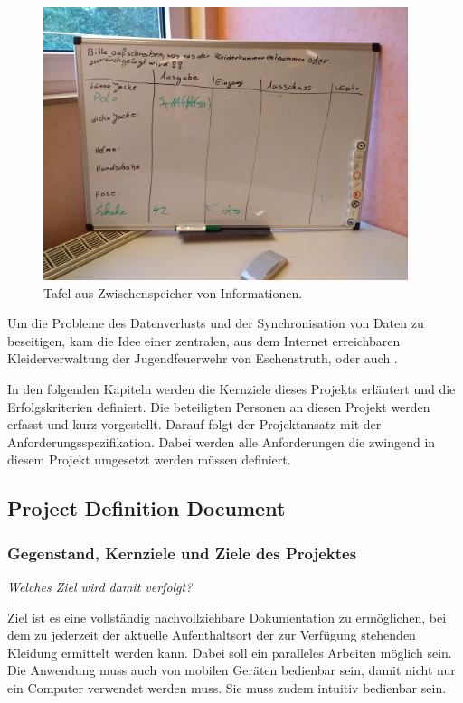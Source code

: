 \begin{figure}[hbtp]
  \centering
  \includegraphics[width=0.95\textwidth]{res/IMG_20180815_193814370}
  \caption{Tafel aus Zwischenspeicher von Informationen.}
  \label{fig:tafel}
\end{figure}

Um die Probleme des Datenverlusts und der Synchronisation von Daten zu beseitigen, kam die Idee einer zentralen, aus dem Internet erreichbaren Kleiderverwaltung der Jugendfeuerwehr von Eschenstruth, oder auch \project.

In den folgenden Kapiteln werden die Kernziele dieses Projekts erläutert und die Erfolgskriterien definiert. Die beteiligten Personen an diesen Projekt werden erfasst und kurz vorgestellt. Darauf folgt der Projektansatz mit der Anforderungsspezifikation. Dabei werden alle Anforderungen die zwingend in diesem Projekt umgesetzt werden müssen definiert. 

\subsection{Project Definition Document}

\subsubsection{Gegenstand, Kernziele und Ziele des Projektes}

\textit{Welches Ziel wird damit verfolgt?}

Ziel ist es eine vollständig nachvollziehbare Dokumentation zu ermöglichen, bei dem zu jederzeit der aktuelle Aufenthaltsort der zur Verfügung stehenden Kleidung ermittelt werden kann. Dabei soll ein paralleles Arbeiten möglich sein. Die Anwendung muss auch von mobilen Geräten bedienbar sein, damit nicht nur ein Computer verwendet werden muss. Sie muss zudem intuitiv bedienbar sein. 

